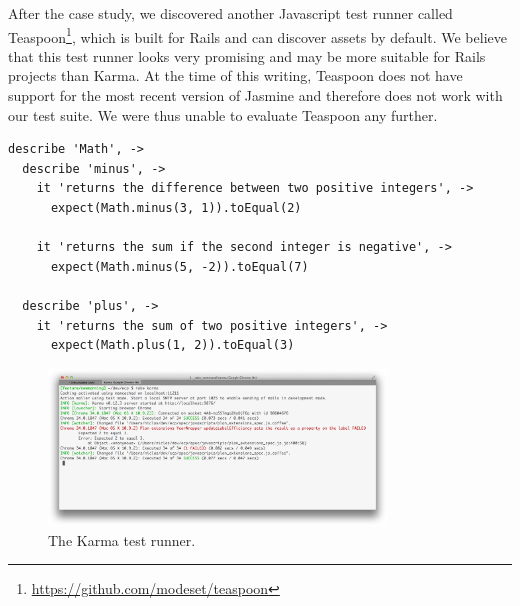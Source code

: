 After the case study, we discovered another Javascript test runner
called Teaspoon\footnote{\url{https://github.com/modeset/teaspoon}},
which is built for Rails and can discover assets by default. We believe
that this test runner looks very promising and may be more suitable for
Rails projects than Karma. At the time of this writing, Teaspoon does
not have support for the most recent version of Jasmine and therefore
does not work with our test suite. We were thus unable to evaluate
Teaspoon any further.\\

\begin{lstlisting}[caption=Example of Jasmine tests for a module (compare with code listing \ref{lst:rspec}).,
                   label=lst:jasmine, float=t, language=HTML]
describe 'Math', ->
  describe 'minus', ->
    it 'returns the difference between two positive integers', ->
      expect(Math.minus(3, 1)).toEqual(2)

    it 'returns the sum if the second integer is negative', ->
      expect(Math.minus(5, -2)).toEqual(7)

  describe 'plus', ->
    it 'returns the sum of two positive integers', ->
      expect(Math.plus(1, 2)).toEqual(3)
\end{lstlisting}

\begin{figure}
\centering
\includegraphics[width=0.8\textwidth]{results/choices/karma_runner}
\caption{The Karma test runner.}
\label{fig:karma_runner}
\end{figure}
